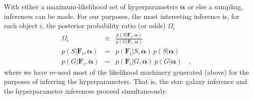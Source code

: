 \documentclass[12pt,preprint]{aastex}
\newcommand{\datavector}[1]{\boldsymbol{#1}}
\newcommand{\flux}{\datavector{F}}
\newcommand{\hyperpars}{\datavector{\alpha}}
\begin{document}
With either a maximum-likelihood set of hyperparameters $\hyperpars$
or else a sampling, inferences can be made.  For our purposes, the
most interesting inference is, for each object $i$, the posterior
probability ratio (or odds) $\Omega_i$
\begin{eqnarray}\displaystyle
\Omega_i & \equiv & \frac{p(S|\flux_i,\hyperpars)}
                         {p(G|\flux_i,\hyperpars)}
\nonumber\\
p(S|\flux_i,\hyperpars) & = & p(\flux_i|S,\hyperpars)\,p(S|\hyperpars)
\nonumber\\
p(G|\flux_i,\hyperpars) & = & p(\flux_i|G,\hyperpars)\,p(G|\hyperpars)
\quad ,
\end{eqnarray}
where we have re-used most of the likelihood machinery generated
(above) for the purposes of inferring the hyperparameters.  That is,
the star--galaxy inference and the hyperparameter inferences proceed
simultaneously.
\end{document}
